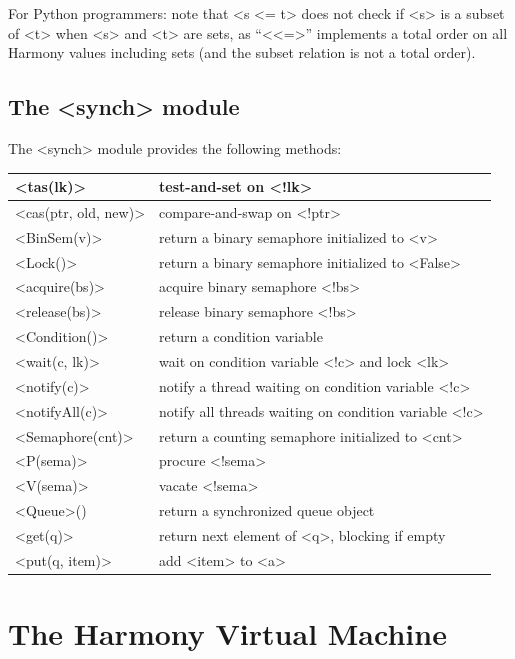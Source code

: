 \documentclass{report}
\begin{document}
\vspace{1em}
For Python programmers: note that <{s <= t}> does not check if <{s}> is a subset of
<{t}> when <{s}> and <{t}> are sets, as ``<{<=}>'' implements a total order on all Harmony values including sets (and the subset relation is not a total order).

\section{The <{synch}> module}

%
The <{synch}> module provides the following methods:

\vspace{1em}
\begin{tabular}{|l|l|}
\hline
<{tas(lk)}> & test-and-set on <{!lk}> \\
\hline
<{cas(ptr, old, new)}> & compare-and-swap on <{!ptr}> \\
\hline
<{BinSem(v)}> & return a binary semaphore initialized to <{v}> \\
\hline
<{Lock()}> & return a binary semaphore initialized to <{False}> \\
\hline
<{acquire(bs)}> & acquire binary semaphore <{!bs}> \\
\hline
<{release(bs)}> & release binary semaphore <{!bs}> \\
\hline
<{Condition()}> & return a condition variable \\
\hline
<{wait(c, lk)}> & wait on condition variable <{!c}>
and lock <{lk}> \\ \hline
<{notify(c)}> & notify a thread waiting on condition variable <{!c}> \\
\hline
<{notifyAll(c)}> & notify all threads waiting on condition variable <{!c}> \\
\hline
<{Semaphore(cnt)}> & return a counting semaphore initialized to <{cnt}> \\
\hline
<{P(sema)}> & procure <{!sema}>  \\
\hline
<{V(sema)}> & vacate <{!sema}>  \\
\hline
<{Queue}>() & return a synchronized queue object \\
\hline
<{get(q)}> & return next element of <{q}>, blocking if empty \\
\hline
<{put(q, item)}> & add <{item}> to <{a}> \\
\hline
\end{tabular}


\chapter{The Harmony Virtual Machine}\label{app:hvm}
\end{document}
